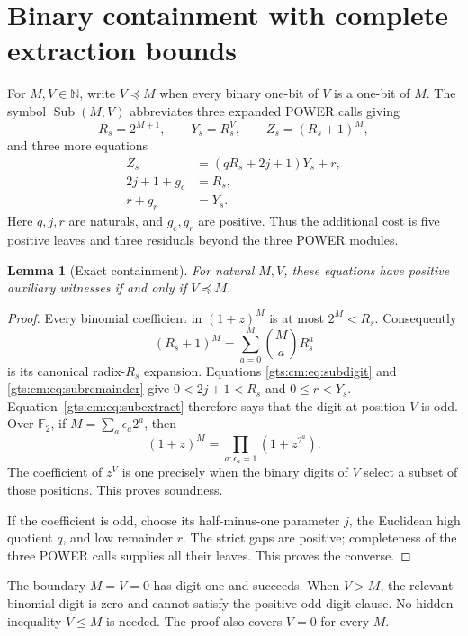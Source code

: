 \documentclass[11pt,letterpaper]{article}
\newtheorem{lemma}[theorem]{Lemma}
\theoremstyle{definition}
\theoremstyle{remark}
\newcommand{\N}{\mathbb N}
\newcommand{\Sub}{\operatorname{Sub}}
\begin{document}
\section{Binary containment with complete extraction bounds}
\label{gts:cm:sec:sub}
For $M,V\in\N$, write $V\preceq M$ when every binary one-bit of $V$ is a one-bit of $M$. The symbol $\Sub(M,V)$ abbreviates three expanded POWER calls giving
\begin{equation}\label{gts:cm:eq:subpowers}
 R_s=2^{M+1},\qquad Y_s=R_s^V,\qquad Z_s=(R_s+1)^M,
\end{equation}
and three more equations
\begin{align}
 Z_s&=(qR_s+2j+1)Y_s+r,\label{gts:cm:eq:subextract}\\
 2j+1+g_c&=R_s,\label{gts:cm:eq:subdigit}\\
 r+g_r&=Y_s.\label{gts:cm:eq:subremainder}
\end{align}
Here $q,j,r$ are naturals, and $g_c,g_r$ are positive. Thus the additional cost is five positive leaves and three residuals beyond the three POWER modules.

\begin{lemma}[Exact containment]\label{gts:cm:lem:sub}
For natural $M,V$, these equations have positive auxiliary witnesses if and only if $V\preceq M$.
\end{lemma}
\begin{proof}
Every binomial coefficient in $(1+z)^M$ is at most $2^M<R_s$. Consequently
\[
 (R_s+1)^M=\sum_{a=0}^M\binom MaR_s^a
\]
is its canonical radix-$R_s$ expansion. Equations \eqref{gts:cm:eq:subdigit} and \eqref{gts:cm:eq:subremainder} give $0<2j+1<R_s$ and $0\le r<Y_s$. Equation~\eqref{gts:cm:eq:subextract} therefore says that the digit at position $V$ is odd. Over $\mathbb F_2$, if $M=\sum_a\epsilon_a2^a$, then
\[
 (1+z)^M=\prod_{a:\epsilon_a=1}(1+z^{2^a}).
\]
The coefficient of $z^V$ is one precisely when the binary digits of $V$ select a subset of those positions. This proves soundness.

If the coefficient is odd, choose its half-minus-one parameter $j$, the Euclidean high quotient $q$, and low remainder $r$. The strict gaps are positive; completeness of the three POWER calls supplies all their leaves. This proves the converse.
\end{proof}
The boundary $M=V=0$ has digit one and succeeds. When $V>M$, the relevant binomial digit is zero and cannot satisfy the positive odd-digit clause. No hidden inequality $V\le M$ is needed. The proof also covers $V=0$ for every $M$.
\end{document}
